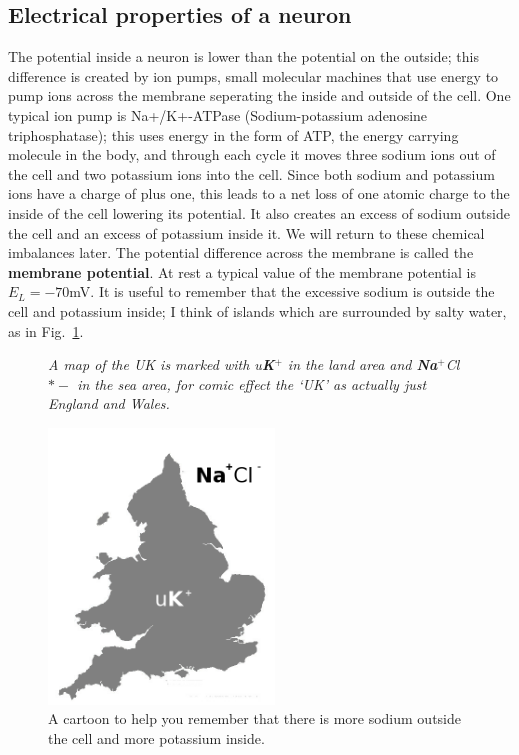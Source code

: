 \documentclass[12pt]{article}
\begin{document}
\subsection*{Electrical properties of a neuron}
The potential inside a neuron is lower than the potential on the
outside; this difference is created by ion pumps, small molecular
machines that use energy to pump ions across the membrane seperating
the inside and outside of the cell. One typical ion pump is
Na+/K+-ATPase (Sodium-potassium adenosine triphosphatase); this uses
energy in the form of ATP, the energy carrying molecule in the body,
and through each cycle it moves three sodium ions out of the cell and
two potassium ions into the cell. Since both sodium and potassium ions
have a charge of plus one, this leads to a net loss of one atomic
charge to the inside of the cell lowering its potential. It also
creates an excess of sodium outside the cell and an excess of
potassium inside it. We will return to these chemical imbalances
later. The potential difference across the membrane is called the
\textbf{membrane potential}. At rest a typical value of the membrane
potential is $E_L=-70 $mV. It is useful to remember that the excessive
sodium is outside the cell and potassium inside; I think of islands
which are surrounded by salty water, as in Fig.~\ref{in_out}.


\begin{figure}
    {\textsl{A map of the UK is marked with u\textbf{K}$^+$ in the land area and \textbf{Na}$^+$Cl$*-$ in the sea area, for comic effect the `UK' as actually just England and Wales.} 
}
    {
        \begin{center}
      \includegraphics[width=6cm]{in_out_future}
        \end{center}
        }
\caption{A cartoon to help you remember that there is more sodium outside the cell and more potassium inside.\label{in_out}}
\end{figure}
\end{document}
